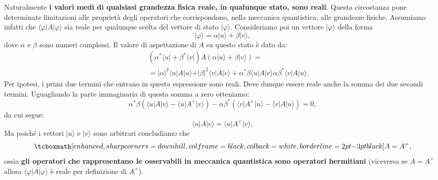 Naturalmente \textbf{i valori medi di qualsiasi grandezza fisica reale, in qualunque stato, sono reali}. Questa circostanza pone determinate limitazioni alle proprietà degli operatori che corrispondono, nella meccanica quantistica, alle grandezze fisiche. Assumiamo infatti che $\langle \varphi \vert A \vert \varphi \rangle$ sia reale per qualunque scelta del vettore di stato $\vert \varphi \rangle$. Consideriamo poi un vettore $\vert \varphi \rangle$ della forma
	\begin{equation}
		\vert \varphi \rangle = \alpha \vert u \rangle + \beta \vert v \rangle,
	\end{equation}
dove $\alpha$ e $\beta$ sono numeri complessi. Il valore di aspettazione di $A$ su questo stato è dato da:
	\begin{eqnarray}
		& &\left( \alpha ^* \langle u \vert + \beta ^* \langle v \vert \right) A \left(\alpha \vert u \rangle + \beta \vert v \rangle \right) = \nonumber \\
		& &=\vert \alpha \vert ^2 \langle u \vert A \vert u \rangle + \vert \beta \vert ^2 \langle v \vert A \vert v \rangle + \alpha ^* \beta \langle u \vert A \vert v \rangle \alpha  \beta ^* \langle v \vert A \vert u \rangle.
	\end{eqnarray}
Per ipotesi, i primi due termini che entrano in questa espressione sono reali. Deve dunque essere reale anche la somma dei due secondi termini. Uguagliando la parte immaginaria di questa somma a zero otteniamo:
	\begin{equation}
		\label{eq:cap4_1}
		\alpha ^* \beta \left(\langle u \vert A \vert v \rangle -\langle u \vert A^{+} \vert v \rangle \right)-  \alpha  \beta ^* \left( \langle v \vert A^{+} \vert u \rangle -\langle v \vert A \vert u \rangle \right) =0, 
	\end{equation}
da cui segue:
	\begin{equation}
		\langle u \vert A \vert v \rangle = \langle u \vert A^{+} \vert v \rangle ,
	\end{equation}
Ma poiché i vettori $\vert u \rangle$ e $\vert v \rangle$ sono arbitrari concludiamo che
	\begin{equation}
		\tcboxmath[enhanced, sharp corners=downhill, colframe=black, colback=white, borderline={2pt}{-3pt}{black}]{
			A= A^{+},
			}
	\end{equation}
ossia \textbf{gli operatori che rappresentano le osservabili in meccanica quantistica sono operatori hermitiani} (viceversa se $A= A^{+}$ allora $\langle \varphi \vert A \vert \varphi \rangle$ è reale per definizione di $A^{+}$).\\ \\

